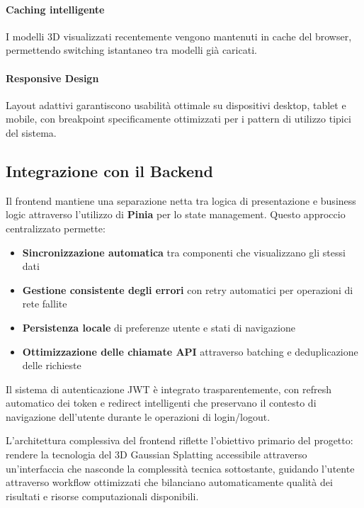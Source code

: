 \paragraph{Caching intelligente}
I modelli 3D visualizzati recentemente vengono mantenuti in cache del browser, permettendo switching istantaneo tra modelli già caricati.

\paragraph{Responsive Design}
Layout adattivi garantiscono usabilità ottimale su dispositivi desktop, tablet e mobile, con breakpoint specificamente ottimizzati per i pattern di utilizzo tipici del sistema.

\subsection{Integrazione con il Backend}

Il frontend mantiene una separazione netta tra logica di presentazione e business logic attraverso l'utilizzo di \textbf{Pinia} per lo state management. Questo approccio centralizzato permette:

\begin{itemize}
	\item \textbf{Sincronizzazione automatica} tra componenti che visualizzano gli stessi dati
	\item \textbf{Gestione consistente degli errori} con retry automatici per operazioni di rete fallite
	\item \textbf{Persistenza locale} di preferenze utente e stati di navigazione
	\item \textbf{Ottimizzazione delle chiamate API} attraverso batching e deduplicazione delle richieste
\end{itemize}

Il sistema di autenticazione JWT è integrato trasparentemente, con refresh automatico dei token e redirect intelligenti che preservano il contesto di navigazione dell'utente durante le operazioni di login/logout.\newline\newline

L'architettura complessiva del frontend riflette l'obiettivo primario del progetto: rendere la tecnologia del 3D Gaussian Splatting accessibile attraverso un'interfaccia che nasconde la complessità tecnica sottostante, guidando l'utente attraverso workflow ottimizzati che bilanciano automaticamente qualità dei risultati e risorse computazionali disponibili.